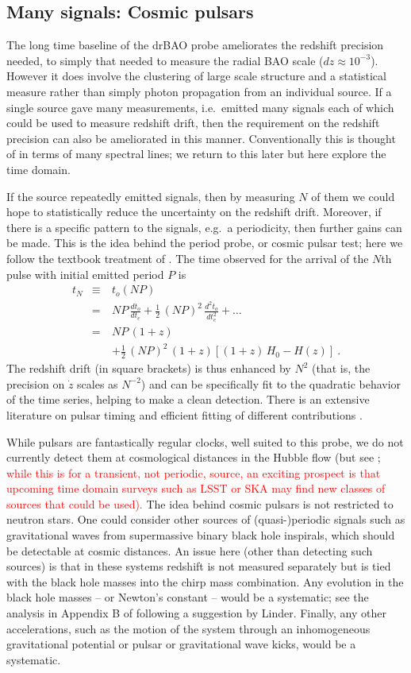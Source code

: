 \documentclass[preprint2, 10pt]{aastex}
\newcommand{\bea}{\begin{eqnarray}}
\newcommand{\eea}{\end{eqnarray}}
\begin{document}
\subsection{Many signals: Cosmic pulsars} 

The long time baseline of the drBAO probe ameliorates the redshift 
precision needed, to simply that needed to measure the radial BAO scale 
($dz\approx10^{-3}$).  However it does involve the clustering of large scale 
structure and a statistical measure rather than simply photon propagation 
from an individual source.  If a single source gave many measurements, 
i.e.\ emitted many signals each of which could be used to measure redshift 
drift, then the requirement on the redshift precision can also be 
ameliorated in this manner.  
Conventionally this is thought of in terms of many spectral lines; we 
return to this later but here explore the time domain. 

If the source repeatedly emitted signals, then by measuring $N$ of them 
we could hope to statistically reduce the uncertainty on the redshift drift.  
Moreover, if there 
is a specific pattern to the signals, e.g.\ a periodicity, then further 
gains can be made.  This is the idea behind the period probe, or cosmic 
pulsar test; here we follow the textbook treatment of \citet{fpoc}.  The time 
observed for the arrival of the $N$th pulse with initial emitted period $P$ is 
\bea 
t_N&\equiv& t_o(NP)\nonumber\\ 
&=&NP\,\frac{dt_o}{dt_e}+\frac{1}{2}\,(NP)^2\,\frac{d^2t_o}{dt_e^2}+\dots\\ 
&=&NP\,(1+z)\nonumber\\ 
&\quad&+\frac{1}{2}\,(NP)^2\,(1+z)\left[(1+z)\,H_0-H(z)\right]\ . 
\eea 
The redshift drift (in square brackets) is thus enhanced by $N^2$ (that 
is, the precision on $\dot z$ scales as $N^{-2}$) and 
can be specifically fit to the quadratic behavior of the time series, 
helping to make a clean detection.  There is an extensive literature on 
pulsar timing and efficient fitting of different contributions 
\citep{pulsars}. 

While pulsars are fantastically regular clocks, well suited to this probe, 
we do not currently detect them at cosmological distances in the Hubble 
flow (but see \citet{13071628}; 
\textcolor{red}{
while this is for a transient, 
not periodic, source, an exciting prospect is that upcoming time domain surveys 
such as LSST or SKA may find new classes of sources that could be used).} 
The idea behind cosmic pulsars is not 
restricted to neutron stars.  
One could consider other sources of (quasi-)periodic signals such as 
gravitational waves from supermassive binary black hole inspirals, which 
should be detectable 
at cosmic distances.  An issue here (other than detecting such sources) 
is that in these systems redshift is not measured separately but is tied 
with the black hole masses into the chirp mass combination.  Any evolution 
in the black hole masses -- or Newton's constant -- would be a systematic; 
see the analysis in Appendix B of \citet{09122724} following a suggestion 
by Linder.  Finally, any other accelerations, such as the motion of the system 
through an inhomogeneous gravitational potential or pulsar or gravitational 
wave kicks, would be a systematic. 
\end{document}
